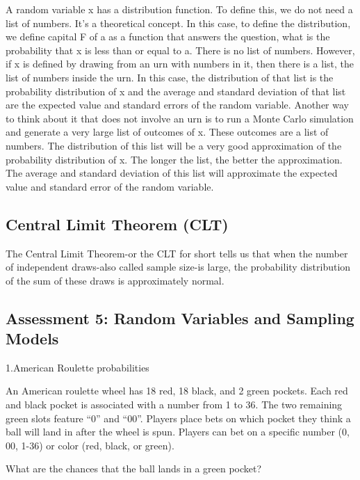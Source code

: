 \documentclass[
]{article}
\begin{document}
A random variable x has a distribution function. To define this, we do
not need a list of numbers. It's a theoretical concept. In this case, to
define the distribution, we define capital F of a as a function that
answers the question, what is the probability that x is less than or
equal to a. There is no list of numbers. However, if x is defined by
drawing from an urn with numbers in it, then there is a list, the list
of numbers inside the urn. In this case, the distribution of that list
is the probability distribution of x and the average and standard
deviation of that list are the expected value and standard errors of the
random variable. Another way to think about it that does not involve an
urn is to run a Monte Carlo simulation and generate a very large list of
outcomes of x. These outcomes are a list of numbers. The distribution of
this list will be a very good approximation of the probability
distribution of x. The longer the list, the better the approximation.
The average and standard deviation of this list will approximate the
expected value and standard error of the random variable.

\hypertarget{central-limit-theorem-clt}{%
\subsection{Central Limit Theorem
(CLT)}\label{central-limit-theorem-clt}}

The Central Limit Theorem-or the CLT for short tells us that when the
number of independent draws-also called sample size-is large, the
probability distribution of the sum of these draws is approximately
normal.

\hypertarget{assessment-5-random-variables-and-sampling-models}{%
\subsection{Assessment 5: Random Variables and Sampling
Models}\label{assessment-5-random-variables-and-sampling-models}}

1.American Roulette probabilities

An American roulette wheel has 18 red, 18 black, and 2 green pockets.
Each red and black pocket is associated with a number from 1 to 36. The
two remaining green slots feature ``0'' and ``00''. Players place bets
on which pocket they think a ball will land in after the wheel is spun.
Players can bet on a specific number (0, 00, 1-36) or color (red, black,
or green).

What are the chances that the ball lands in a green pocket?
\end{document}
